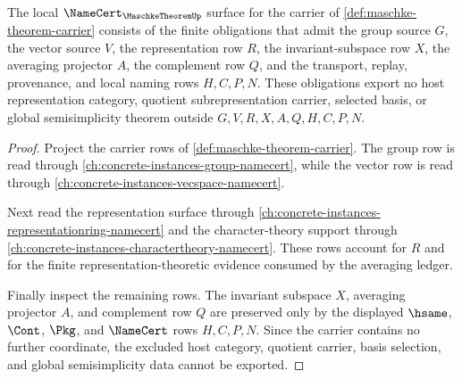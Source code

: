 \begin{theorem}
\label{thm:maschke-theorem-namecert-obligations}
The local $\NameCert_{\MaschkeTheoremUp}$ surface for the carrier of \autoref{def:maschke-theorem-carrier} consists of the finite obligations that admit the group source $G$, the vector source $V$, the representation row $R$, the invariant-subspace row $X$, the averaging projector $A$, the complement row $Q$, and the transport, replay, provenance, and local naming rows $H,C,P,N$. These obligations export no host representation category, quotient subrepresentation carrier, selected basis, or global semisimplicity theorem outside $G,V,R,X,A,Q,H,C,P,N$.
\end{theorem}
\begin{proof}
Project the carrier rows of \autoref{def:maschke-theorem-carrier}. The group row is read through \autoref{ch:concrete-instances-group-namecert}, while the vector row is read through \autoref{ch:concrete-instances-vecspace-namecert}.

Next read the representation surface through \autoref{ch:concrete-instances-representationring-namecert} and the character-theory support through \autoref{ch:concrete-instances-charactertheory-namecert}. These rows account for $R$ and for the finite representation-theoretic evidence consumed by the averaging ledger.

Finally inspect the remaining rows. The invariant subspace $X$, averaging projector $A$, and complement row $Q$ are preserved only by the displayed $\hsame$, $\Cont$, $\Pkg$, and $\NameCert$ rows $H,C,P,N$. Since the carrier contains no further coordinate, the excluded host category, quotient carrier, basis selection, and global semisimplicity data cannot be exported.
\end{proof}

